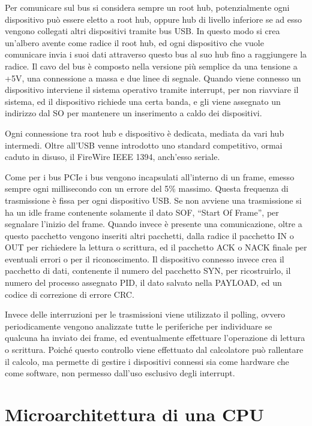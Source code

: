 \documentclass{article}
\numberwithin{equation}{subsection}
\begin{document}
Per comunicare sul bus si considera sempre un root hub, potenzialmente ogni dispositivo può essere eletto a root hub, oppure hub di livello inferiore se ad esso vengono collegati 
altri dispositivi tramite bus USB. In questo modo si crea un'albero avente come radice il root hub, ed ogni dispositivo che vuole comunicare invia i suoi dati attraverso questo bus al 
suo hub fino a raggiungere la radice. Il cavo del bus è composto nella versione più semplice da una tensione a +5V, una connessione a massa e due linee di segnale. 
Quando viene connesso un dispositivo interviene il sistema operativo tramite interrupt, per non riavviare il sistema, ed il dispositivo richiede una certa banda, e gli viene assegnato un 
indirizzo dal SO per mantenere un inserimento a caldo dei dispositivi. 

Ogni connessione tra root hub e dispositivo è dedicata, mediata da vari hub intermedi. Oltre all'USB venne introdotto uno standard competitivo, ormai caduto in disuso, il FireWire IEEE 1394, 
anch'esso seriale. 

Come per i bus PCIe i bus vengono incapsulati all'interno di un frame, emesso sempre ogni millisecondo con un errore del 5\% massimo. Questa frequenza di trasmissione è fissa per ogni dispositivo 
USB. Se non avviene una trasmissione si ha un idle frame contenente solamente il dato SOF, ``Start Of Frame'', per segnalare l'inizio del frame. Quando invece è presente una comunicazione, 
oltre a questo pacchetto vengono inseriti altri pacchetti, dalla radice il pacchetto IN o OUT per richiedere la lettura o scrittura, ed il pacchetto ACK o NACK finale per eventuali errori 
o per il riconoscimento. Il dispositivo connesso invece crea il pacchetto di dati, contenente il numero del pacchetto SYN, per ricostruirlo, il numero del processo assegnato PID, il dato 
salvato nella PAYLOAD, ed un codice di correzione di errore CRC. 

Invece delle interruzioni per le trasmissioni viene utilizzato il polling, ovvero periodicamente vengono analizzate tutte le periferiche per individuare se qualcuna ha inviato dei frame, 
ed eventualmente effettuare l'operazione di lettura o scrittura. Poiché questo controllo viene effettuato dal calcolatore può rallentare il calcolo, ma permette di gestire i dispositivi 
connessi sia come hardware che come software, non permesso dall'uso esclusivo degli interrupt. 

\clearpage

\section{Microarchitettura di una CPU}
\end{document}
